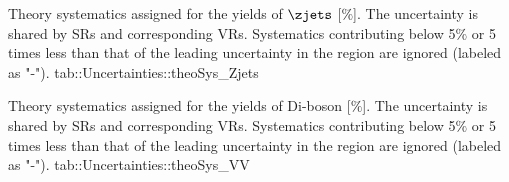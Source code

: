 {Theory systematics assigned for the yields of $\zjets$ [$\%$]. The uncertainty is shared by SRs and corresponding VRs. Systematics contributing below 5$\%$ or 5 times less than that of the leading uncertainty in the region are ignored (labeled as "-"). }
{tab::Uncertainties::theoSys_Zjets}


{Theory systematics assigned for the yields of Di-boson [$\%$]. The uncertainty is shared by SRs and corresponding VRs. Systematics contributing below 5$\%$ or 5 times less than that of the leading uncertainty in the region are ignored (labeled as "-"). }
{tab::Uncertainties::theoSys_VV}


